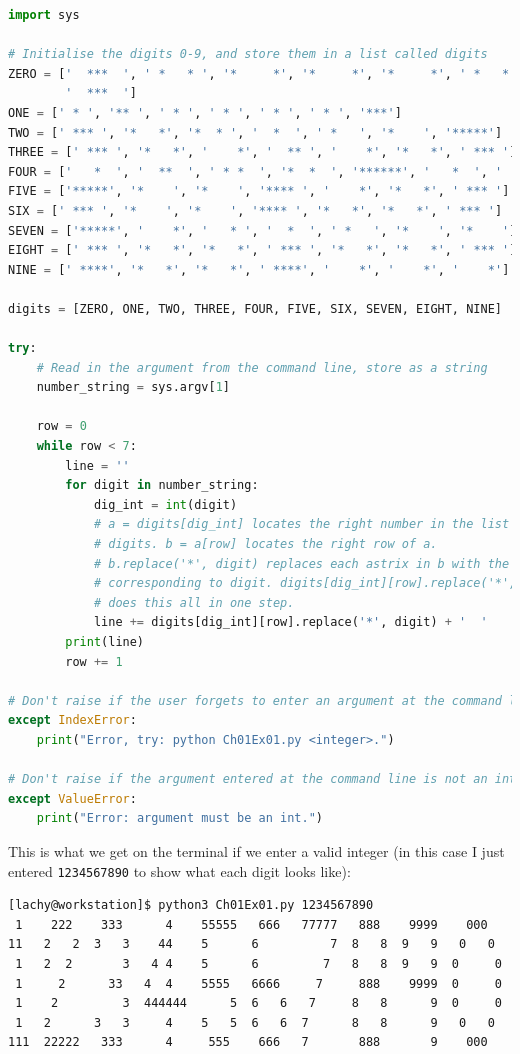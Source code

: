 \documentclass{report}
\begin{document}
\begin{lstlisting}[language=Python, style=pythonStyle]
import sys

# Initialise the digits 0-9, and store them in a list called digits
ZERO = ['  ***  ', ' *   * ', '*     *', '*     *', '*     *', ' *   * ', 
        '  ***  ']
ONE = [' * ', '** ', ' * ', ' * ', ' * ', ' * ', '***']
TWO = [' *** ', '*   *', '*  * ', '  *  ', ' *   ', '*    ', '*****']
THREE = [' *** ', '*   *', '    *', '  ** ', '    *', '*   *', ' *** ']
FOUR = ['   *  ', '  **  ', ' * *  ', '*  *  ', '******', '   *  ', '   *  ']
FIVE = ['*****', '*    ', '*    ', '**** ', '    *', '*   *', ' *** ']
SIX = [' *** ', '*    ', '*    ', '**** ', '*   *', '*   *', ' *** ']
SEVEN = ['*****', '    *', '   * ', '  *  ', ' *   ', '*    ', '*    ']
EIGHT = [' *** ', '*   *', '*   *', ' *** ', '*   *', '*   *', ' *** ']
NINE = [' ****', '*   *', '*   *', ' ****', '    *', '    *', '    *']

digits = [ZERO, ONE, TWO, THREE, FOUR, FIVE, SIX, SEVEN, EIGHT, NINE]

try:
    # Read in the argument from the command line, store as a string
    number_string = sys.argv[1]

    row = 0
    while row < 7:
        line = ''
        for digit in number_string:
            dig_int = int(digit)
            # a = digits[dig_int] locates the right number in the list
            # digits. b = a[row] locates the right row of a. 
            # b.replace('*', digit) replaces each astrix in b with the number 
            # corresponding to digit. digits[dig_int][row].replace('*', digit) 
            # does this all in one step.
            line += digits[dig_int][row].replace('*', digit) + '  '
        print(line)
        row += 1

# Don't raise if the user forgets to enter an argument at the command line
except IndexError:
    print("Error, try: python Ch01Ex01.py <integer>.")

# Don't raise if the argument entered at the command line is not an int
except ValueError:
    print("Error: argument must be an int.")

\end{lstlisting}
\noindent This is what we get on the terminal if we enter a valid integer (in this case I just entered \verb|1234567890| to show what each digit looks like):
\begin{lstlisting}[language=bash, style=terminalStyle]
[lachy@workstation]$ python3 Ch01Ex01.py 1234567890
 1    222    333      4    55555   666   77777   888    9999    000    
11   2   2  3   3    44    5      6          7  8   8  9   9   0   0   
 1   2  2       3   4 4    5      6         7   8   8  9   9  0     0  
 1     2      33   4  4    5555   6666     7     888    9999  0     0  
 1    2         3  444444      5  6   6   7     8   8      9  0     0  
 1   2      3   3     4    5   5  6   6  7      8   8      9   0   0   
111  22222   333      4     555    666   7       888       9    000    
\end{lstlisting}
\end{document}
